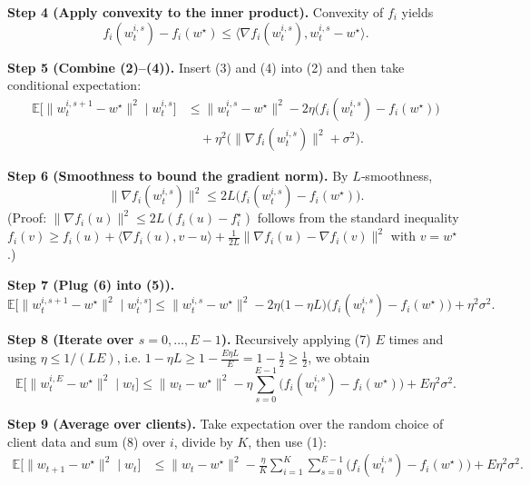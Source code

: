 \documentclass{article}
\begin{document}
\noindent\textbf{Step 4 (Apply convexity to the inner product).}  
Convexity of $f_i$ yields
\[
f_i(w_{t}^{i,s})-f_i(w^\star)\le\langle\nabla f_i(w_{t}^{i,s}),w_{t}^{i,s}-w^\star\rangle .
\tag{4}
\]

\noindent\textbf{Step 5 (Combine (2)–(4)).}  
Insert (3) and (4) into (2) and then take conditional expectation:
\[
\begin{aligned}
\mathbb{E}\!\bigl[\|w_{t}^{i,s+1}-w^\star\|^2\mid w_{t}^{i,s}\bigr]
&\le \|w_{t}^{i,s}-w^\star\|^2
-2\eta\bigl(f_i(w_{t}^{i,s})-f_i(w^\star)\bigr) \\
&\quad +\eta^2\bigl(\|\nabla f_i(w_{t}^{i,s})\|^2+\sigma^2\bigr).
\end{aligned}
\tag{5}
\]

\noindent\textbf{Step 6 (Smoothness to bound the gradient norm).}  
By $L$‑smoothness,
\[
\|\nabla f_i(w_{t}^{i,s})\|^2
\le 2L\bigl(f_i(w_{t}^{i,s})-f_i(w^\star)\bigr) .
\tag{6}
\]
(Proof: $ \|\nabla f_i(u)\|^2\le 2L (f_i(u)-f_i^\star)$ follows from
the standard inequality $f_i(v)\ge f_i(u)+\langle\nabla f_i(u),v-u\rangle
+\frac{1}{2L}\|\nabla f_i(u)-\nabla f_i(v)\|^2$ with $v=w^\star$.)

\noindent\textbf{Step 7 (Plug (6) into (5)).}
\[
\mathbb{E}\!\bigl[\|w_{t}^{i,s+1}-w^\star\|^2\mid w_{t}^{i,s}\bigr]
\le \|w_{t}^{i,s}-w^\star\|^2
-2\eta\bigl(1-\eta L\bigr)\bigl(f_i(w_{t}^{i,s})-f_i(w^\star)\bigr)
+\eta^2\sigma^2 .
\tag{7}
\]

\noindent\textbf{Step 8 (Iterate over $s=0,\dots ,E-1$).}  
Recursively applying (7) $E$ times and using $\eta\le 1/(L E)$, i.e.
$1-\eta L\ge 1-\tfrac{E\eta L}{E}=1-\tfrac12\ge \tfrac12$, we obtain
\[
\mathbb{E}\!\bigl[\|w_{t}^{i,E}-w^\star\|^2\mid w_t\bigr]
\le \|w_t-w^\star\|^2
- \eta\sum_{s=0}^{E-1}\bigl(f_i(w_{t}^{i,s})-f_i(w^\star)\bigr)
+E\eta^2\sigma^2 .
\tag{8}
\]

\noindent\textbf{Step 9 (Average over clients).}  
Take expectation over the random choice of client data and sum (8) over $i$,
divide by $K$, then use (1):
\[
\begin{aligned}
\mathbb{E}\!\bigl[\|w_{t+1}-w^\star\|^2\mid w_t\bigr]
&\le \|w_t-w^\star\|^2
- \frac{\eta}{K}\sum_{i=1}^{K}\sum_{s=0}^{E-1}\bigl(f_i(w_{t}^{i,s})-f_i(w^\star)\bigr)
+E\eta^2\sigma^2 .
\end{aligned}
\tag{9}
\]
\end{document}
